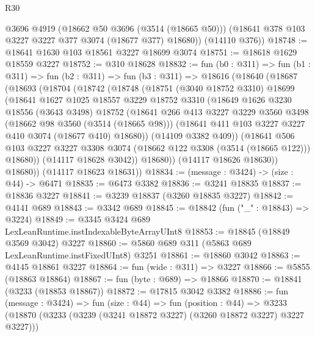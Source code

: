 \begin{lexlean}{R30}
\begin{coremodule}
        @3696
        @4919
        (@18662 @50 @3696 (@3514 (@18665 @50)))
        (@18641 @378 @103 @3227 @3227 @377 @3074 (@18677 @377) @18680))
      (@14110 @376))
@18748 := @18641 @1630 @103 @18561 @3227 @18699 @3074
@18751 := @18618 @1629 @18559 @3227
@18752 := @310 @18628
@18832 := fun (b0 : @311) =>
  fun (b1 : @311) =>
  fun (b2 : @311) =>
  fun (b3 : @311) =>
  @18616
    (@18640
      (@18687
        (@18693
          (@18704
            (@18742
              (@18748
                (@18751
                  (@3040 @18752 @3310)
                  @18699
                  (@18641
                    @1627
                    @1025
                    @18557
                    @3229
                    @18752
                    @3310
                    (@18649
                      @1626
                      @3230
                      @18556
                      (@3643 @3498)
                      @18752
                      (@18641
                        @266
                        @413
                        @3227
                        @3229
                        @3560
                        @3498
                        (@18662 @98 @3560 (@3514 (@18665 @98)))
                        (@18641 @411 @103 @3227 @3227 @410 @3074 (@18677 @410) @18680))
                      (@14109 @3382 @409))
                    (@18641
                      @506
                      @103
                      @3227
                      @3227
                      @3308
                      @3074
                      (@18662 @122 @3308 (@3514 (@18665 @122)))
                      @18680))
                  (@14117 @18628 @3042))
                @18680))
            (@14117 @18626 @18630))
          @18680))
      (@14117 @18623 @18631))
@18834 := (message : @3424) -> (size : @44) -> @6471
@18835 := @6473 @3382
@18836 := @3241 @18835
@18837 := @18836 @3227
@18841 := @3239 @18837 (@3260 @18835 @3227)
@18842 := @4141 @689
@18843 := @3342 @689
@18845 := @18842 (fun ("_" : @18843) => @3224)
@18849 := @3345 @3424 @689 LexLeanRuntime.instIndexableByteArrayUInt8
@18853 := @18845 (@18849 @3569 @3042) @3227
@18860 := @5860 @689 @311 (@5863 @689 LexLeanRuntime.instFixedUInt8) @3251
@18861 := @18860 @3042
@18863 := @4145 @18861 @3227
@18864 := fun (wide : @311) => @3227
@18866 := @5855 (@18863 @18864)
@18867 := fun (byte : @689) => @18866
@18870 := @18841 (@3233 (@18853 @18867))
@18872 := @17815 @3042 @3382
@18886 := fun (message : @3424) =>
  fun (size : @44) =>
  fun (position : @44) =>
  @3233 (@18870 (@3233 (@3239 (@3241 @18872 @3227) (@3260 @18872 @3227) @3227 @3227)))

\end{coremodule}
\end{lexlean}

